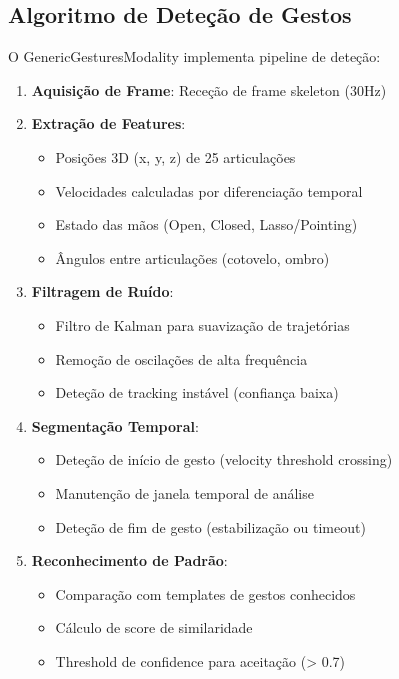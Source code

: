 \subsection{Algoritmo de Deteção de Gestos}

O GenericGesturesModality implementa pipeline de deteção:

\begin{enumerate}
    \item \textbf{Aquisição de Frame}: Receção de frame skeleton (30Hz)

    \item \textbf{Extração de Features}:
    \begin{itemize}
        \item Posições 3D (x, y, z) de 25 articulações
        \item Velocidades calculadas por diferenciação temporal
        \item Estado das mãos (Open, Closed, Lasso/Pointing)
        \item Ângulos entre articulações (cotovelo, ombro)
    \end{itemize}

    \item \textbf{Filtragem de Ruído}:
    \begin{itemize}
        \item Filtro de Kalman para suavização de trajetórias
        \item Remoção de oscilações de alta frequência
        \item Deteção de tracking instável (confiança baixa)
    \end{itemize}

    \item \textbf{Segmentação Temporal}:
    \begin{itemize}
        \item Deteção de início de gesto (velocity threshold crossing)
        \item Manutenção de janela temporal de análise
        \item Deteção de fim de gesto (estabilização ou timeout)
    \end{itemize}

    \item \textbf{Reconhecimento de Padrão}:
    \begin{itemize}
        \item Comparação com templates de gestos conhecidos
        \item Cálculo de score de similaridade
        \item Threshold de confidence para aceitação (> 0.7)
    \end{itemize}


\end{enumerate}
